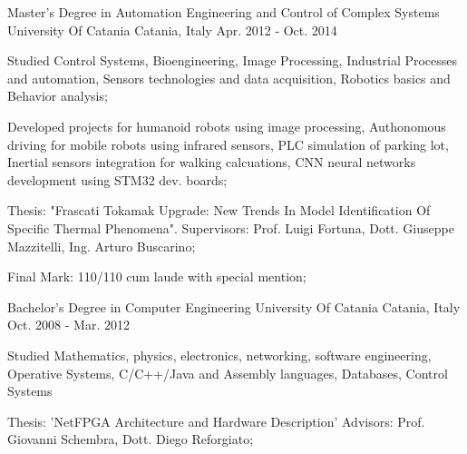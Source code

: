 

\begin{cventries}

  \cventry
    {Master’s Degree in Automation Engineering and Control of
    Complex Systems} %
    {University Of Catania} %
    {Catania, Italy} %
    {Apr. 2012 - Oct. 2014} %
    {
      \begin{cvitems} %
              \item {Studied Control Systems, Bioengineering, Image Processing, Industrial Processes and automation, Sensors technologies and data acquisition,
              Robotics basics and Behavior analysis;}
              \item {Developed projects for humanoid robots using image processing, Authonomous driving for mobile robots using infrared sensors,
              PLC simulation of parking lot, Inertial sensors integration for walking calcuations, CNN neural networks development using STM32 dev. boards;}
              \item {Thesis: "Frascati Tokamak Upgrade: New Trends In Model Identification
              Of Specific Thermal Phenomena". Supervisors: Prof. Luigi Fortuna, Dott. Giuseppe Mazzitelli, Ing. Arturo
              Buscarino;}
              \item {Final Mark: 110/110 cum laude with special mention;}
      \end{cvitems}
    }

    \cventry
    {Bachelor's Degree in Computer Engineering} %
    {University Of Catania} %
    {Catania, Italy} %
    {Oct. 2008 - Mar. 2012} %
    {
      \begin{cvitems} %
              \item {Studied Mathematics, physics, electronics, networking, software engineering, Operative Systems, C/C++/Java and Assembly
              languages, Databases, Control Systems}
              \item {Thesis: ’NetFPGA Architecture and Hardware Description’
              Advisors: Prof. Giovanni Schembra, Dott. Diego Reforgiato;}
      \end{cvitems}
    }


\end{cventries}

